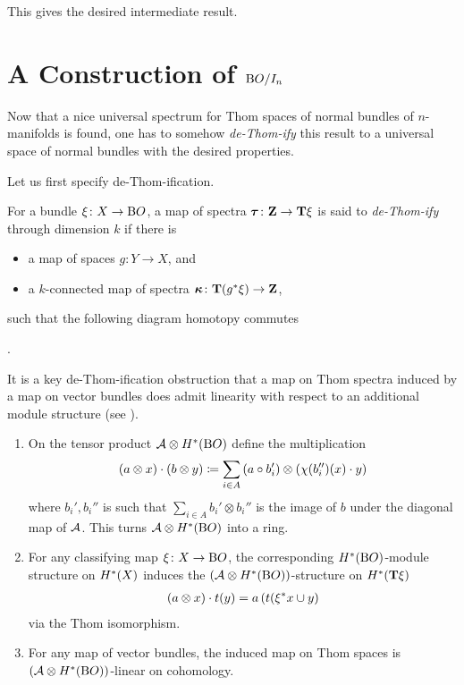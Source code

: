 This gives the desired intermediate result.


\section*{A Construction of $\mathrm{B}O/I_{n}$}
Now that a nice universal spectrum for Thom spaces of normal bundles
of $n$-manifolds is found, one has to somehow \emph{de-Thom-ify} this
result to a universal space of normal bundles with the desired
properties.

Let us first specify de-Thom-ification.
\begin{Def}
  For a bundle $\xi\colon X\to\mathrm{B}O$, a map of spectra
  $\bm{\tau}\colon\bm{\mathrm{Z}}\to\bm{\mathrm{T}}{\xi}$ is said to
  \emph{de-Thom-ify} through dimension $k$ if there is
  \begin{itemize}
  \item a map of spaces $g\colon Y\to X$, and
  \item a $k$-connected map of spectra
    $\bm{\kappa}\colon\bm{\mathrm{T}}{({g}^*\xi)}\to\bm{\mathrm{Z}}$,
  \end{itemize}
  such that the following diagram homotopy commutes
  \begin{center}
  \end{center}
  .
\end{Def}


It is a key de-Thom-ification obstruction
that a map on Thom spectra induced by a map on vector bundles does
admit linearity with respect to an additional module structure
(see \cite[p.~107ff]{immersionconj}).
\begin{Lem*}
  \begin{enumerate}
  \item On the tensor product $\mathcal{A}\otimes H^*(\mathrm{B}O)$ define the multiplication
    \begin{gather*}
      (a\otimes x) \cdot (b\otimes y)
      \coloneqq \sum_{i\in A}
      \left(a\circ b_i'\right) \otimes \left(\chi(b_i'')(x)\cdot y\right)
    \end{gather*}
    where $b_i', b_i''$ is such that $\sum_{i\in A}b_i'\otimes b_i''$ is
    the image of $b$ under the diagonal map of $\mathcal{A}$.
    This turns $\mathcal{A}\otimes H^*(\mathrm{B}O)$ into a ring.
  \item For any classifying map $\xi\colon X\to\mathrm{B}O$, the
    corresponding $H^*(\mathrm{B}O)$-module structure on $H^*(X)$
    induces the $(\mathcal{A}\otimes H^*(\mathrm{B}O))$-structure on $H^*(\bm{\mathrm{T}}{\xi})$
    \begin{gather*}
      (a\otimes x)\cdot t(y) = a\left( t({\xi}^* x\cup y \right)
    \end{gather*}
    via the Thom isomorphism.
  \item For any map of vector bundles, the induced map on Thom spaces
    is $(\mathcal{A}\otimes H^*(\mathrm{B}O))$-linear on cohomology.
  \end{enumerate}
\end{Lem*}

